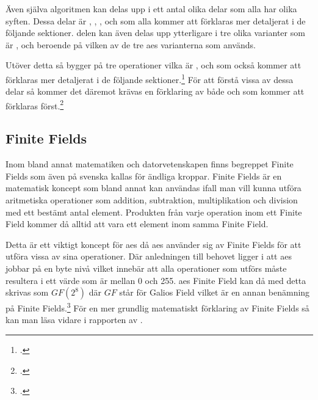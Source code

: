 Även själva algoritmen kan delas upp i ett antal olika delar som alla har olika syften. Dessa delar är , , ,
 och  som alla kommer att förklaras mer detaljerat i de följande sektioner.  delen kan även
delas upp ytterligare i tre olika varianter som är ,  och  beroende
på vilken av de tre \acrshort{aes} varianterna som används.

Utöver detta så bygger  på tre operationer vilka är ,  och
 som också kommer att förklaras mer detaljerat i de följande sektioner.\footcite{aes_wiki} För att förstå vissa av dessa delar
så kommer det däremot krävas en förklaring av både  och  som kommer att förklaras först.\footcite{daemen1999aes}

\subsection{Finite Fields}
\label{sec:finite-fields}
Inom bland annat matematiken och datorvetenskapen finns begreppet Finite Fields
som även på svenska kallas för ändliga kroppar. Finite Fields är en matematisk
koncept som bland annat kan användas ifall man vill kunna utföra aritmetiska
operationer som addition, subtraktion, multiplikation och division med ett
bestämt antal element. Produkten från varje operation inom ett Finite Field
kommer då alltid att vara ett element inom samma Finite Field.

Detta är ett viktigt koncept för \acrshort{aes} då \acrshort{aes} använder sig av
Finite Fields för att utföra vissa av sina operationer. Där anledningen till behovet
ligger i att \acrshort{aes} jobbar på en byte nivå vilket innebär att alla operationer
som utförs måste resultera i ett värde som är mellan 0 och 255. \acrshort{aes} Finite Field
kan då med detta skrivas som $GF(2^8)$ där $GF$ står för Galios Field vilket är
en annan benämning på Finite Fields.\footcite{finitefield_wiki} För en mer grundlig matematiskt förklaring av Finite Fields så kan man läsa vidare i rapporten
 av \citeauthor{boman2016andliga}.

